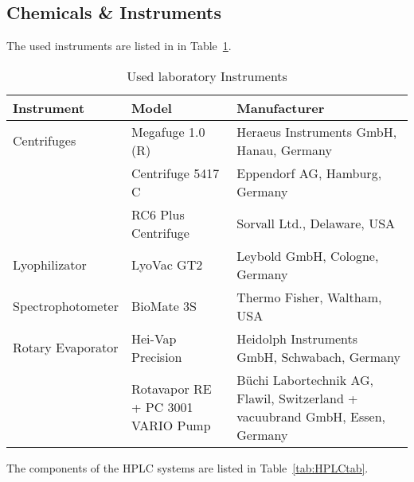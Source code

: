 \subsection{Chemicals \& Instruments} %
\label{sec:chemicals_&_instruments}

The used instruments are listed in in Table~\ref{tab:labins}.

\begin{table}[H]
	\caption{Used laboratory Instruments}
	\label{tab:labins}
	\centering
	\begin{tabularx}{\textwidth}{XXX}
		\textbf{Instrument}			& \textbf{Model}		& \textbf{Manufacturer}	\\
		\midrule
		Centrifuges			&	Megafuge 1.0 (R)		&	Heraeus Instruments GmbH, Hanau, Germany	\\
							&	Centrifuge 5417 C 		&	Eppendorf AG, Hamburg, Germany				\\
							&	RC6 Plus Centrifuge 	&	Sorvall Ltd., Delaware, USA					\\
		Lyophilizator		&	LyoVac GT2				&	Leybold GmbH, Cologne, Germany				\\
		Spectrophotometer	&	BioMate 3S				&	Thermo Fisher, Waltham, USA					\\
		Rotary Evaporator	&	Hei-Vap Precision		&	Heidolph Instruments GmbH, Schwabach, Germany	\\
							&	Rotavapor RE + PC 3001 VARIO Pump	&	Büchi Labortechnik AG, Flawil, Switzerland + vacuubrand GmbH, Essen, Germany \\

		\bottomrule
	\end{tabularx}
\end{table}

The components of the HPLC systems are listed in Table~\ref{tab:HPLCtab}.

